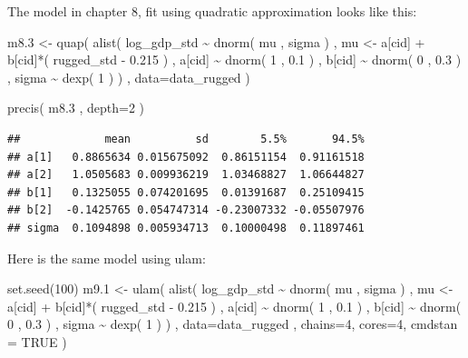 \documentclass[
]{book}
\newenvironment{Shaded}{\begin{snugshade}}{\end{snugshade}}
\newcommand{\AttributeTok}[1]{\textcolor[rgb]{0.77,0.63,0.00}{#1}}
\newcommand{\ConstantTok}[1]{\textcolor[rgb]{0.00,0.00,0.00}{#1}}
\newcommand{\DecValTok}[1]{\textcolor[rgb]{0.00,0.00,0.81}{#1}}
\newcommand{\FloatTok}[1]{\textcolor[rgb]{0.00,0.00,0.81}{#1}}
\newcommand{\FunctionTok}[1]{\textcolor[rgb]{0.00,0.00,0.00}{#1}}
\newcommand{\NormalTok}[1]{#1}
\newcommand{\OtherTok}[1]{\textcolor[rgb]{0.56,0.35,0.01}{#1}}
\newcommand{\SpecialCharTok}[1]{\textcolor[rgb]{0.00,0.00,0.00}{#1}}
\begin{document}
The model in chapter 8, fit using quadratic approximation looks like this:

\begin{Shaded}
\begin{Highlighting}[]
\NormalTok{m8}\FloatTok{.3} \OtherTok{\textless{}{-}} \FunctionTok{quap}\NormalTok{( }\FunctionTok{alist}\NormalTok{(}
\NormalTok{log\_gdp\_std }\SpecialCharTok{\textasciitilde{}} \FunctionTok{dnorm}\NormalTok{( mu , sigma ) , }
\NormalTok{mu }\OtherTok{\textless{}{-}}\NormalTok{ a[cid] }\SpecialCharTok{+}\NormalTok{ b[cid]}\SpecialCharTok{*}\NormalTok{( rugged\_std }\SpecialCharTok{{-}} \FloatTok{0.215}\NormalTok{ ) , }
\NormalTok{a[cid] }\SpecialCharTok{\textasciitilde{}} \FunctionTok{dnorm}\NormalTok{( }\DecValTok{1}\NormalTok{ , }\FloatTok{0.1}\NormalTok{ ) , }
\NormalTok{b[cid] }\SpecialCharTok{\textasciitilde{}} \FunctionTok{dnorm}\NormalTok{( }\DecValTok{0}\NormalTok{ , }\FloatTok{0.3}\NormalTok{ ) , }
\NormalTok{sigma }\SpecialCharTok{\textasciitilde{}} \FunctionTok{dexp}\NormalTok{( }\DecValTok{1}\NormalTok{ )}
\NormalTok{) , }\AttributeTok{data=}\NormalTok{data\_rugged )}

\FunctionTok{precis}\NormalTok{( m8}\FloatTok{.3}\NormalTok{ , }\AttributeTok{depth=}\DecValTok{2}\NormalTok{ )}
\end{Highlighting}
\end{Shaded}

\begin{verbatim}
##             mean          sd        5.5%       94.5%
## a[1]   0.8865634 0.015675092  0.86151154  0.91161518
## a[2]   1.0505683 0.009936219  1.03468827  1.06644827
## b[1]   0.1325055 0.074201695  0.01391687  0.25109415
## b[2]  -0.1425765 0.054747314 -0.23007332 -0.05507976
## sigma  0.1094898 0.005934713  0.10000498  0.11897461
\end{verbatim}

Here is the same model using ulam:

\begin{Shaded}
\begin{Highlighting}[]
\FunctionTok{set.seed}\NormalTok{(}\DecValTok{100}\NormalTok{)}
\NormalTok{m9}\FloatTok{.1} \OtherTok{\textless{}{-}} \FunctionTok{ulam}\NormalTok{( }\FunctionTok{alist}\NormalTok{(}
\NormalTok{log\_gdp\_std }\SpecialCharTok{\textasciitilde{}} \FunctionTok{dnorm}\NormalTok{( mu , sigma ) ,}
\NormalTok{mu }\OtherTok{\textless{}{-}}\NormalTok{ a[cid] }\SpecialCharTok{+}\NormalTok{ b[cid]}\SpecialCharTok{*}\NormalTok{( rugged\_std }\SpecialCharTok{{-}} \FloatTok{0.215}\NormalTok{ ) ,}
\NormalTok{a[cid] }\SpecialCharTok{\textasciitilde{}} \FunctionTok{dnorm}\NormalTok{( }\DecValTok{1}\NormalTok{ , }\FloatTok{0.1}\NormalTok{ ) ,}
\NormalTok{b[cid] }\SpecialCharTok{\textasciitilde{}} \FunctionTok{dnorm}\NormalTok{( }\DecValTok{0}\NormalTok{ , }\FloatTok{0.3}\NormalTok{ ) ,}
\NormalTok{sigma }\SpecialCharTok{\textasciitilde{}} \FunctionTok{dexp}\NormalTok{( }\DecValTok{1}\NormalTok{ )}
\NormalTok{) , }\AttributeTok{data=}\NormalTok{data\_rugged , }\AttributeTok{chains=}\DecValTok{4}\NormalTok{, }\AttributeTok{cores=}\DecValTok{4}\NormalTok{, }\AttributeTok{cmdstan =} \ConstantTok{TRUE}\NormalTok{ )}
\end{Highlighting}
\end{Shaded}
\end{document}
